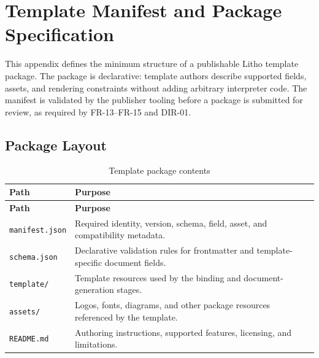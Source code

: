 
\chapter{Template Manifest and Package Specification}
\label{app:template-manifest}

This appendix defines the minimum structure of a publishable Litho template
package. The package is declarative: template authors describe supported fields,
assets, and rendering constraints without adding arbitrary interpreter code. The
manifest is validated by the publisher tooling before a package is submitted for
review, as required by FR-13--FR-15 and DIR-01.

\section{Package Layout}
\begin{xltabular}{\textwidth}{@{}p{0.28\textwidth}X@{}}
\caption{Template package contents}\label{tab:template-package}\\
\toprule
\textbf{Path} & \textbf{Purpose} \\
\midrule
\endfirsthead
\toprule
\textbf{Path} & \textbf{Purpose} \\
\midrule
\endhead
\texttt{manifest.json} & Required identity, version, schema, field, asset, and compatibility metadata. \\
\texttt{schema.json} & Declarative validation rules for frontmatter and template-specific document fields. \\
\texttt{template/} & Template resources used by the binding and document-generation stages. \\
\texttt{assets/} & Logos, fonts, diagrams, and other package resources referenced by the template. \\
\texttt{README.md} & Authoring instructions, supported features, licensing, and limitations. \\
\bottomrule
\end{xltabular}

